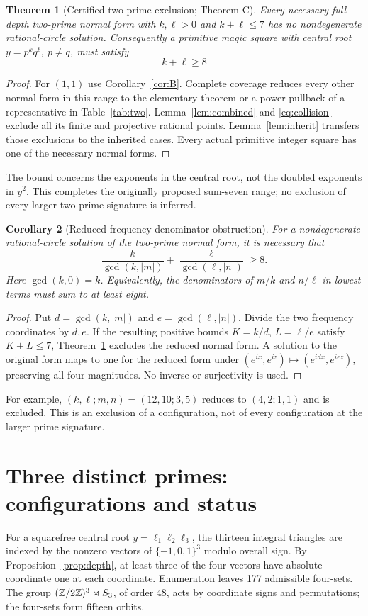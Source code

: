 \documentclass[11pt,letterpaper]{article}
\newtheorem{theorem}{Theorem}[section]
\newtheorem{corollary}[theorem]{Corollary}
\theoremstyle{definition}\newtheorem{definition}[theorem]{Definition}
\theoremstyle{remark}\newtheorem{remark}[theorem]{Remark}
\newcommand{\TwoPrimeLowerBound}{8}
\begin{document}
\begin{theorem}[Certified two-prime exclusion; Theorem C]\label{thm:C}
Every necessary full-depth two-prime normal form with $k,\ell>0$ and $k+\ell\le7$ has no nondegenerate rational-circle solution. Consequently a primitive magic square with central root $y=p^kq^\ell$, $p\ne q$, must satisfy
\[
\boxed{k+\ell\ge\TwoPrimeLowerBound}
\]
\end{theorem}
\begin{proof}
For $(1,1)$ use Corollary~\ref{cor:B}. Complete coverage reduces every other normal form in this range to the elementary theorem or a power pullback of a representative in Table~\ref{tab:two}. Lemma~\ref{lem:combined} and \eqref{eq:collision} exclude all its finite and projective rational points. Lemma~\ref{lem:inherit} transfers those exclusions to the inherited cases. Every actual primitive integer square has one of the necessary normal forms.
\end{proof}
The bound concerns the exponents in the central root, not the doubled exponents in $y^2$. This completes the originally proposed sum-seven range; no exclusion of every larger two-prime signature is inferred.

\begin{corollary}[Reduced-frequency denominator obstruction]\label{cor:reduced}
For a nondegenerate rational-circle solution of the two-prime normal form, it is necessary that
\[
\boxed{\frac{k}{\gcd(k,|m|)}+\frac{\ell}{\gcd(\ell,|n|)}\ge8.}
\]
Here $\gcd(k,0)=k$. Equivalently, the denominators of $m/k$ and $n/\ell$ in lowest terms must sum to at least eight.
\end{corollary}
\begin{proof}
Put $d=\gcd(k,|m|)$ and $e=\gcd(\ell,|n|)$. Divide the two frequency coordinates by $d,e$. If the resulting positive bounds $K=k/d$, $L=\ell/e$ satisfy $K+L\le7$, Theorem~\ref{thm:C} excludes the reduced normal form. A solution to the original form maps to one for the reduced form under $(e^{ix},e^{iz})\mapsto(e^{idx},e^{iez})$, preserving all four magnitudes. No inverse or surjectivity is used.
\end{proof}
For example, $(k,\ell;m,n)=(12,10;3,5)$ reduces to $(4,2;1,1)$ and is excluded. This is an exclusion of a configuration, not of every configuration at the larger prime signature.

\section{Three distinct primes: configurations and status}\label{sec:three}
For a squarefree central root $y=\ell_1\ell_2\ell_3$, the thirteen integral triangles are indexed by the nonzero vectors of $\{-1,0,1\}^3$ modulo overall sign. By Proposition~\ref{prop:depth}, at least three of the four vectors have absolute coordinate one at each coordinate. Enumeration leaves 177 admissible four-sets. The group $(\mathbb Z/2\mathbb Z)^3\rtimes S_3$, of order 48, acts by coordinate signs and permutations; the four-sets form fifteen orbits.
\end{document}
